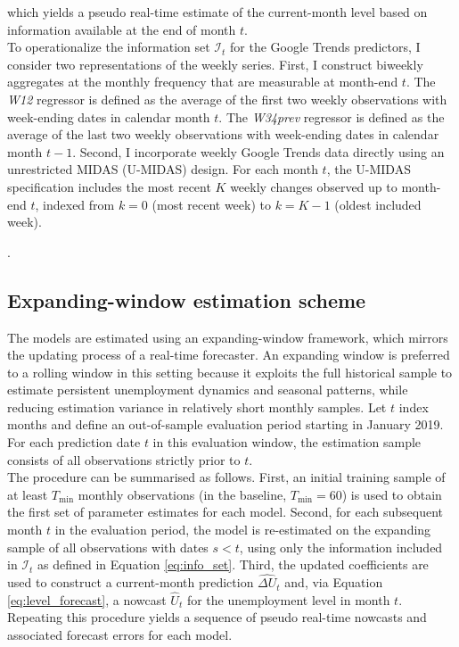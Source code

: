 \documentclass[12pt,a4paper]{article}
\begin{document}
which yields a pseudo real-time estimate of the current-month level based on information available at the end of month $t$.\\
To operationalize the information set $\mathcal{I}_t$ for the Google Trends predictors, I consider two representations of the weekly series.
First, I construct biweekly aggregates at the monthly frequency that are measurable at month-end $t$.
The \textit{W12} regressor is defined as the average of the first two weekly observations with week-ending dates in calendar month $t$.
The \textit{W34prev} regressor is defined as the average of the last two weekly observations with week-ending dates in calendar month $t-1$.
Second, I incorporate weekly Google Trends data directly using an unrestricted MIDAS (U-MIDAS) design.
For each month $t$, the U-MIDAS specification includes the most recent $K$ weekly changes observed up to month-end $t$, indexed from $k=0$ (most recent week) to $k=K-1$ (oldest included week).








.
\subsection{Expanding-window estimation scheme}
The models are estimated using an expanding-window framework, which mirrors the updating process of a real-time forecaster. An expanding window is preferred to a rolling window in this setting because it exploits the full historical sample to estimate persistent unemployment dynamics and seasonal patterns, while reducing estimation variance in relatively short monthly samples. Let $t$ index months and define an out-of-sample evaluation period starting in January 2019. For each prediction date $t$ in this evaluation window, the estimation sample consists of all observations strictly prior to $t$.\\
The procedure can be summarised as follows. First, an initial training sample of at least $T_{\min}$ monthly observations (in the baseline, $T_{\min} = 60$) is used to obtain the first set of parameter estimates for each model. Second, for each subsequent month $t$ in the evaluation period, the model is re-estimated on the expanding sample of all observations with dates $s < t$, using only the information included in $\mathcal{I}_t$ as defined in Equation \eqref{eq:info_set}. Third, the updated coefficients are used to construct a current-month prediction $\widehat{\Delta U}_t$
 and, via Equation \eqref{eq:level_forecast}, a nowcast $\widehat{U}_t$ for the unemployment level in month $t$.
Repeating this procedure yields a sequence of pseudo real-time nowcasts and associated forecast errors for each model. 
\end{document}
